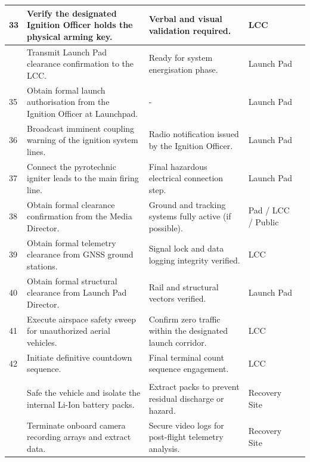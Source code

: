 \documentclass[11pt,a4paper]{article}
\begin{document}
\begin{xltabular}{\textwidth}{|>{\centering\arraybackslash}p{0.6cm}|X|X|>{\centering\arraybackslash}p{2.8cm}|>{\centering\arraybackslash}p{1.0cm}|}
    33 & Verify the designated Ignition Officer holds the physical arming key. & Verbal and visual validation required. & LCC & \\  & Transmit Launch Pad clearance confirmation to the LCC. & Ready for system energisation phase. & Launch Pad & \\ \hline
    35 & Obtain formal launch authorisation from the Ignition Officer at Launchpad. & - & Launch Pad & \\ \hline
    36 & Broadcast imminent coupling warning of the ignition system lines. & Radio notification issued by the Ignition Officer. & Launch Pad & \\ \hline
    37 & Connect the pyrotechnic igniter leads to the main firing line. & Final hazardous electrical connection step. & Launch Pad & \\ \hline
    38 & Obtain formal clearance confirmation from the Media Director. & Ground and tracking systems fully active (if possible). & Pad / LCC / Public & \\ \hline
    39 & Obtain formal telemetry clearance from GNSS ground stations. & Signal lock and data logging integrity verified. & LCC & \\ \hline
    40 & Obtain formal structural clearance from Launch Pad Director. & Rail and structural vectors verified. & Launch Pad & \\ \hline
    41 & Execute airspace safety sweep for unauthorized aerial vehicles. & Confirm zero traffic within the designated launch corridor. & LCC & \\ \hline
    42 & Initiate definitive countdown sequence. & Final terminal count sequence engagement. & LCC & \\ \hline
    
     \\  & Safe the vehicle and isolate the internal Li-Ion battery packs. & Extract packs to prevent residual discharge or hazard. & Recovery Site & \\  & Terminate onboard camera recording arrays and extract data. & Secure video logs for post-flight telemetry analysis. & Recovery Site & \\
\end{xltabular}
\end{document}
